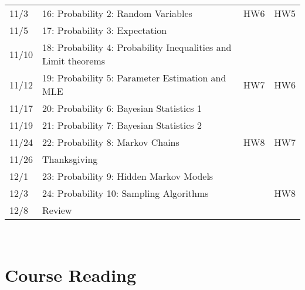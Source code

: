 \documentclass[11pt]{article}
\begin{document}
\begin{centering}
\begin{tabular}{||l|p{3in}|l|l||}
11/3 & 16: Probability 2: Random Variables  & HW6  & HW5  \\ 
11/5 & 17: Probability 3: Expectation &  &  \\ 
\hline

11/10 & 18: Probability 4: Probability Inequalities and Limit theorems&   & \\  
11/12& 19: Probability 5: Parameter Estimation and MLE   & HW7 & HW6   \\  
\hline
11/17 & 20: Probability 6: Bayesian Statistics 1 &   & \\  
11/19& 21: Probability 7: Bayesian Statistics 2 &  &   \\  
\hline
11/24 & 22: Probability 8: Markov Chains  & HW8  & HW7 \\
11/26 & Thanksgiving &   &  \\  
\hline

12/1 & 23: Probability 9: Hidden Markov Models &  &  \\
12/3 & 24: Probability 10: Sampling Algorithms &   & HW8 \\ 
\hline
12/8& Review &  &  \\

\hline\hline

\end{tabular}\\
\end{centering}

\newpage
\section*{Course Reading}
\end{document}
